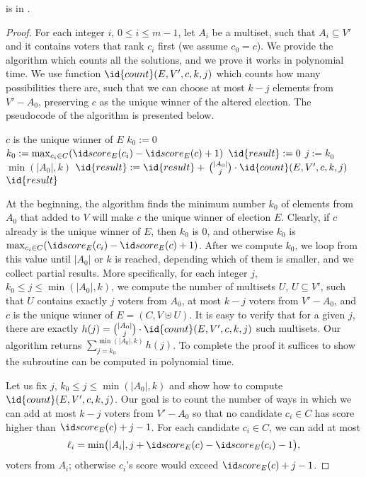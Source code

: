 \begin{theorem} \label{th:plavc}
	 is in \FPclass.
\end{theorem}
\begin{proof}
For each integer $i$, $0\le i\le m-1$, let $A_i$ be a multiset, such that $A_i\subseteq V'$ and it contains voters that rank $c_i$ first (we assume $c_0=c$).
We provide the algorithm which counts all the solutions, and we prove it works in polynomial time.
We use function $\id{count}(E,V',c,k,j)$ which counts how many possibilities there are, such that we can choose at most $k-j$ elements from $V'-A_0$, preserving $c$ as the unique winner of the altered election.
The pseudocode of the algorithm is presented below.

\begin{codebox}
\li	\If $c$ is the unique winner of $E$ \label{plavc:c_checking}
\li		\Then $k_0:=0$ \label{plav:k0_init1}
\li		\Else $k_0:=\max_{c_i\in C}(\score{E}(c_i)-\score{E}(c)+1)$ \label{plavc:k0_init2}
		\End
\li	$\id{result}:=0$ \label{plavc:result_init}
\li	\For $j:=k_0$ \To $\min(|A_0|,k)$ \label{plavc:counting_loop}
\li		\Do $\id{result}:=\id{result}+\,\binom{|A_0|}{j}\cdot\id{count}(E,V',c,k,j)$ \label{plavc:counting}
		\End
\li	\Return $\id{result}$ \label{plavc:returning_result}
\end{codebox}

At the beginning, the algorithm finds the minimum number $k_0$ of elements from $A_0$ that added to $V$ will make $c$ the unique winner of election $E$.
Clearly, if $c$ already is the unique winner of $E$, then $k_0$ is 0, and otherwise $k_0$ is $\max_{c_i\in C}(\score{E}(c_i)-\score{E}(c)+1)$.
After we compute $k_0$, we loop from this value until $|A_0|$ or $k$ is reached, depending which of them is smaller, and we collect partial results.
More specifically, for each integer $j$, $k_0\le j\le\min(|A_0|,k)$, we compute the number of multisets $U$, $U\subseteq V'$, such that $U$ contains exactly $j$ voters from $A_0$, at most $k-j$ voters from $V'-A_0$, and $c$ is the unique winner of $E=(C,V\uplus U)$.
It is easy to verify that for a given $j$, there are exactly $h(j)=\binom{|A_0|}{j}\cdot\id{count}(E,V',c,k,j)$ such multisets.
Our algorithm returns $\sum_{j=k_0}^{\min(|A_0|,k)}h(j)$.
To complete the proof it suffices to show the subroutine  can be computed in polynomial time.

Let us fix $j$, $k_0\le j\le\min(|A_0|,k)$ and show how to compute $\id{count}(E,V',c,k,j)$.
Our goal is to count the number of ways in which we can add at most $k-j$ voters from $V'-A_0$ so that no candidate $c_i\in C$ has score higher than $\score{E}(c)+j-1$.
For each candidate $c_i\in C$, we can add at most
\[
	\ell_i = \min\bigl(|A_i|,j+\score{E}(c)-\score{E}(c_i)-1\bigr),
\]
voters from $A_i$; otherwise $c_i$'s score would exceed $\score{E}(c)+j-1$.


\end{proof}
